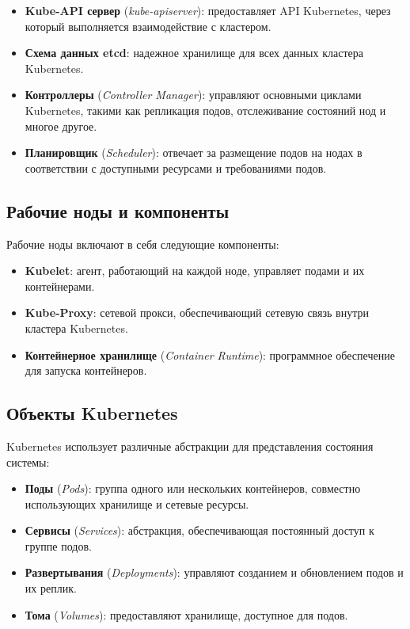 \begin{itemize}
    \item \textbf{Kube-API сервер} (\textit{kube-apiserver}): предоставляет API
Kubernetes, через который выполняется взаимодействие с кластером.
    \item \textbf{Схема данных etcd}: надежное хранилище для всех данных
кластера Kubernetes.
    \item \textbf{Контроллеры} (\textit{Controller Manager}): управляют
основными циклами Kubernetes, такими как репликация подов, отслеживание
состояний нод и многое другое.
    \item \textbf{Планировщик} (\textit{Scheduler}): отвечает за размещение
подов на нодах в соответствии с доступными ресурсами и требованиями подов.
\end{itemize}

\subsection*{Рабочие ноды и компоненты}
Рабочие ноды включают в себя следующие компоненты:

\begin{itemize}
    \item \textbf{Kubelet}: агент, работающий на каждой ноде, управляет подами и
их контейнерами.
    \item \textbf{Kube-Proxy}: сетевой прокси, обеспечивающий сетевую связь
внутри кластера Kubernetes.
    \item \textbf{Контейнерное хранилище} (\textit{Container Runtime}):
программное обеспечение для запуска контейнеров.
\end{itemize}

\subsection*{Объекты Kubernetes}
Kubernetes использует различные абстракции для представления состояния системы:

\begin{itemize}
    \item \textbf{Поды} (\textit{Pods}): группа одного или нескольких
контейнеров, совместно использующих хранилище и сетевые ресурсы.
    \item \textbf{Сервисы} (\textit{Services}): абстракция, обеспечивающая
постоянный доступ к группе подов.
    \item \textbf{Развертывания} (\textit{Deployments}): управляют созданием и
обновлением подов и их реплик.
    \item \textbf{Тома} (\textit{Volumes}): предоставляют хранилище, доступное
для подов.
\end{itemize}

